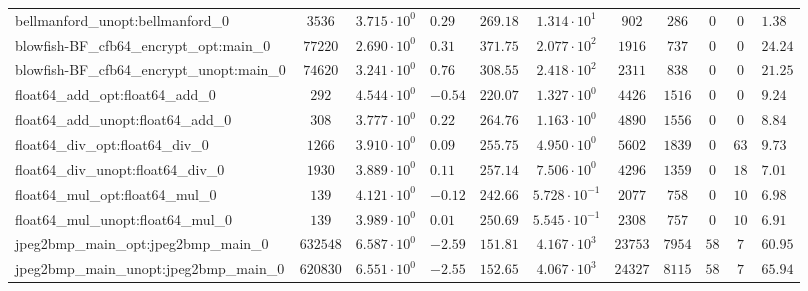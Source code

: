 \begin{tabular}{|l|c|HHc|c|c|c|c|cH|}
bellmanford\_unopt:bellmanford\_0               & $ 3536     $ & $ 3.715 \cdot 10^{0} $ & $ 0.29  $ & $ 269.18 $ & $ 1.314 \cdot 10^{1}  $ & $ 902    $ & $ 286   $ & $ 0   $ & $ 0   $ & $ 1.38    $ \\
blowfish-BF\_cfb64\_encrypt\_opt:main\_0        & $ 77220    $ & $ 2.690 \cdot 10^{0} $ & $ 0.31  $ & $ 371.75 $ & $ 2.077 \cdot 10^{2}  $ & $ 1916   $ & $ 737   $ & $ 0   $ & $ 0   $ & $ 24.24   $ \\
blowfish-BF\_cfb64\_encrypt\_unopt:main\_0      & $ 74620    $ & $ 3.241 \cdot 10^{0} $ & $ 0.76  $ & $ 308.55 $ & $ 2.418 \cdot 10^{2}  $ & $ 2311   $ & $ 838   $ & $ 0   $ & $ 0   $ & $ 21.25   $ \\
float64\_add\_opt:float64\_add\_0               & $ 292      $ & $ 4.544 \cdot 10^{0} $ & $ -0.54 $ & $ 220.07 $ & $ 1.327 \cdot 10^{0}  $ & $ 4426   $ & $ 1516  $ & $ 0   $ & $ 0   $ & $ 9.24    $ \\
float64\_add\_unopt:float64\_add\_0             & $ 308      $ & $ 3.777 \cdot 10^{0} $ & $ 0.22  $ & $ 264.76 $ & $ 1.163 \cdot 10^{0}  $ & $ 4890   $ & $ 1556  $ & $ 0   $ & $ 0   $ & $ 8.84    $ \\
float64\_div\_opt:float64\_div\_0               & $ 1266     $ & $ 3.910 \cdot 10^{0} $ & $ 0.09  $ & $ 255.75 $ & $ 4.950 \cdot 10^{0}  $ & $ 5602   $ & $ 1839  $ & $ 0   $ & $ 63  $ & $ 9.73    $ \\
float64\_div\_unopt:float64\_div\_0             & $ 1930     $ & $ 3.889 \cdot 10^{0} $ & $ 0.11  $ & $ 257.14 $ & $ 7.506 \cdot 10^{0}  $ & $ 4296   $ & $ 1359  $ & $ 0   $ & $ 18  $ & $ 7.01    $ \\
float64\_mul\_opt:float64\_mul\_0               & $ 139      $ & $ 4.121 \cdot 10^{0} $ & $ -0.12 $ & $ 242.66 $ & $ 5.728 \cdot 10^{-1} $ & $ 2077   $ & $ 758   $ & $ 0   $ & $ 10  $ & $ 6.98    $ \\
float64\_mul\_unopt:float64\_mul\_0             & $ 139      $ & $ 3.989 \cdot 10^{0} $ & $ 0.01  $ & $ 250.69 $ & $ 5.545 \cdot 10^{-1} $ & $ 2308   $ & $ 757   $ & $ 0   $ & $ 10  $ & $ 6.91    $ \\
jpeg2bmp\_main\_opt:jpeg2bmp\_main\_0           & $ 632548   $ & $ 6.587 \cdot 10^{0} $ & $ -2.59 $ & $ 151.81 $ & $ 4.167 \cdot 10^{3}  $ & $ 23753  $ & $ 7954  $ & $ 58  $ & $ 7   $ & $ 60.95   $ \\
jpeg2bmp\_main\_unopt:jpeg2bmp\_main\_0         & $ 620830   $ & $ 6.551 \cdot 10^{0} $ & $ -2.55 $ & $ 152.65 $ & $ 4.067 \cdot 10^{3}  $ & $ 24327  $ & $ 8115  $ & $ 58  $ & $ 7   $ & $ 65.94   $ \\

\end{tabular}
